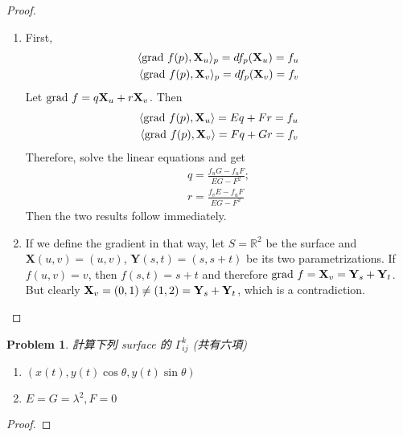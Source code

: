 \documentclass[10pt,a4paper]{article}
\newcounter{theProblemCounter}
\newtheorem{problem}[theProblemCounter]{Problem}
\begin{document}
\begin{proof}
\begin{enumerate}
\item[(a)]
First, 
\begin{align*}
\langle \textrm{grad } f(p), \mathbf{X}_u\rangle_p = df_p(\mathbf{X}_u) = f_u\\
\langle \textrm{grad } f(p), \mathbf{X}_v\rangle_p = df_p(\mathbf{X}_v) = f_v
\end{align*}
Let $\textrm{grad } f = q\mathbf{X}_u + r\mathbf{X}_v$. Then
\begin{align*}
\langle \textrm{grad } f(p), \mathbf{X}_u\rangle = Eq + Fr = f_u\\
\langle \textrm{grad } f(p), \mathbf{X}_v\rangle = Fq + Gr = f_v
\end{align*}
Therefore, solve the linear equations and get
\begin{align*}
q = \frac{f_uG - f_uF}{EG - F^2};\\
r = \frac{f_vE - f_uF}{EG - F^2}
\end{align*}
Then the two results follow immediately.
\item[(b)]
If we define the gradient in that way, let $S = \mathbb{R}^2$ be the surface and $\mathbf{X}(u, v) = (u, v)$, $\mathbf{Y}(s, t) = (s, s+t)$ be its two parametrizations. If $f(u, v) = v$, then $f(s, t) = s+t$ and therefore $\textrm{grad } f = \mathbf{X}_v = \mathbf{Y}_s + \mathbf{Y}_t$. But clearly $\mathbf{X}_v = (0, 1) \neq (1, 2) = \mathbf{Y}_s + \mathbf{Y}_t$, which is a contradiction.
\end{enumerate}
\end{proof}

\setcounter{theProblemCounter}{6}
\begin{problem}
計算下列 surface 的 $\Gamma_{ij}^k$ (共有六項)
\begin{enumerate}
\item[(b)]
$(x(t),y(t)\cos\theta,y(t)\sin\theta)$
\item[(c)]
$E=G=\lambda^2, F=0$
\end{enumerate}
\end{problem}
\begin{proof}
\end{proof}
\end{document}
